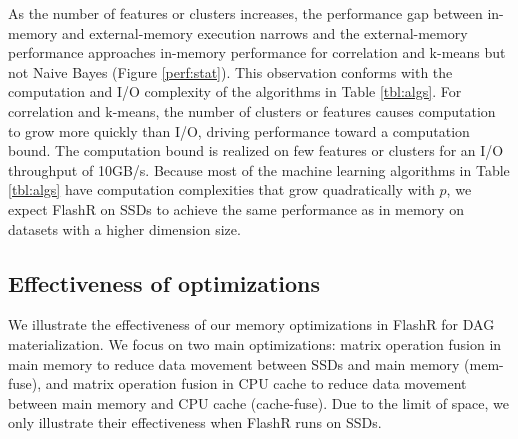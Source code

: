 As the number of features or clusters increases, the performance gap between
in-memory and external-memory execution narrows and the external-memory
performance approaches in-memory performance for correlation and k-means
but not Naive Bayes (Figure \ref{perf:stat}). This observation conforms with
the computation and I/O complexity of the algorithms in Table \ref{tbl:algs}.
For correlation and k-means, the number of clusters or features causes computation
to grow more quickly than I/O, driving performance toward a computation bound.
The computation bound is realized on few features or clusters for an I/O throughput
of 10GB/s. Because most of the machine learning algorithms in Table \ref{tbl:algs} have
computation complexities that grow quadratically with $p$, we expect FlashR on SSDs to
achieve the same performance as in memory on datasets with a higher dimension size.


\subsection{Effectiveness of optimizations}
We illustrate the effectiveness of our memory optimizations in FlashR for
DAG materialization.
We focus on two main optimizations: matrix operation fusion in main memory
to reduce data movement between SSDs and main memory (mem-fuse), and matrix
operation fusion in CPU cache to reduce data movement between main memory and
CPU cache (cache-fuse). Due to the limit of space, we only illustrate their
effectiveness when FlashR runs on SSDs.

